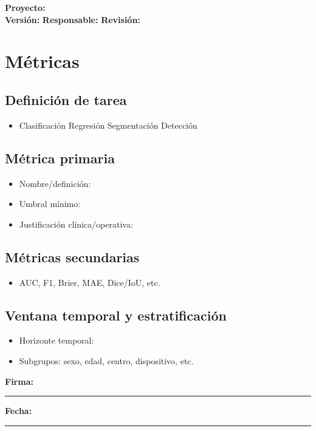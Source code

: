 \documentclass[11pt]{article}
\newcommand{\project}{\textbf{Proyecto:} \underline{\hspace{7cm}}}
\newcommand{\version}{\textbf{Versi\'on:} \underline{\hspace{3cm}}}
\newcommand{\owner}{\textbf{Responsable:} \underline{\hspace{5cm}}}
\newcommand{\review}{\textbf{Revisi\'on:} \underline{\hspace{3cm}}}
\newcommand{\signatureline}{\vspace{0.5cm}\noindent\textbf{Firma:}\ \rule{6cm}{0.4pt} \hfill \textbf{Fecha:}\ \rule{3cm}{0.4pt}}
\begin{document}
\begin{flushright}
\project \\ \version \hspace{1cm} \owner \hspace{1cm} \review
\end{flushright}


\section*{M\'etricas}
\subsection*{Definici\'on de tarea}
\begin{itemize}
  \item Clasificaci\'on \hspace{0.5cm} Regresi\'on \hspace{0.5cm} Segmentaci\'on \hspace{0.5cm} Detecci\'on
\end{itemize}

\subsection*{M\'etrica primaria}
\begin{itemize}
  \item Nombre/definici\'on: \underline{\hspace{10cm}}
  \item Umbral m\'inimo: \underline{\hspace{5cm}}
  \item Justificaci\'on cl\'inica/operativa: \underline{\hspace{8cm}}
\end{itemize}

\subsection*{M\'etricas secundarias}
\begin{itemize}
  \item AUC, F1, Brier, MAE, Dice/IoU, etc.
\end{itemize}

\subsection*{Ventana temporal y estratificaci\'on}
\begin{itemize}
  \item Horizonte temporal: \underline{\hspace{6cm}}
  \item Subgrupos: sexo, edad, centro, dispositivo, etc.
\end{itemize}
\signatureline

\label{LastPage}
\end{document}
